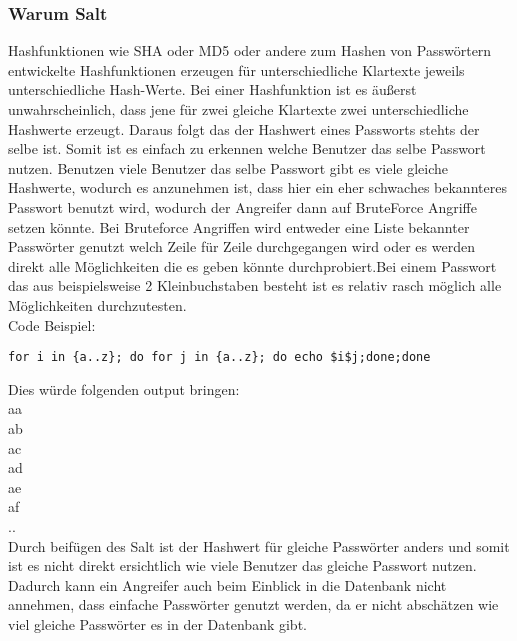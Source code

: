 {\subsubsection{Warum Salt}
Hashfunktionen wie SHA oder MD5 oder andere zum Hashen von Passwörtern entwickelte Hashfunktionen erzeugen für unterschiedliche Klartexte jeweils unterschiedliche Hash-Werte. Bei einer Hashfunktion ist es äußerst unwahrscheinlich, dass jene für zwei gleiche Klartexte zwei unterschiedliche Hashwerte erzeugt. Daraus folgt das der Hashwert eines Passworts stehts der selbe ist. Somit ist es einfach zu erkennen welche Benutzer das selbe Passwort nutzen. Benutzen viele Benutzer das selbe Passwort gibt es viele gleiche Hashwerte, wodurch es anzunehmen ist, dass hier ein eher schwaches bekannteres Passwort benutzt wird, wodurch der Angreifer dann auf BruteForce Angriffe setzen könnte. Bei Bruteforce Angriffen wird entweder eine Liste bekannter Passwörter genutzt welch Zeile für Zeile durchgegangen wird oder es werden direkt alle Möglichkeiten die es geben könnte durchprobiert.Bei einem Passwort das aus beispielsweise 2 Kleinbuchstaben besteht ist es relativ rasch möglich alle Möglichkeiten durchzutesten.\\ Code Beispiel:
\begin{lstlisting} 
for i in {a..z}; do for j in {a..z}; do echo $i$j;done;done 
\end{lstlisting}
Dies würde folgenden output bringen: \\
aa\\
ab\\
ac\\
ad\\
ae\\
af\\
..\\
Durch beifügen des Salt ist der Hashwert für gleiche Passwörter anders und somit ist es nicht direkt ersichtlich wie viele Benutzer das gleiche Passwort nutzen. Dadurch kann ein Angreifer auch beim Einblick in die Datenbank nicht annehmen, dass einfache Passwörter genutzt werden, da er nicht abschätzen wie viel gleiche Passwörter es in der Datenbank gibt.
}

